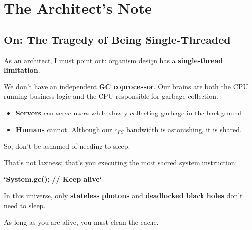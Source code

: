 \section{The Architect's Note}

\subsection{On: The Tragedy of Being Single-Threaded}

As an architect, I must point out: organism design has a \textbf{single-thread limitation}.

We don't have an independent \textbf{GC coprocessor}. Our brains are both the CPU running business logic and the CPU responsible for garbage collection.

\begin{itemize}
\item \textbf{Servers} can serve users while slowly collecting garbage in the background.

\item \textbf{Humans} cannot. Although our \textbf{$c_{FS}$} bandwidth is astonishing, it is shared.
\end{itemize}

So, don't be ashamed of needing to sleep.

That's not laziness; that's you executing the most sacred system instruction:

\textbf{`System.gc(); // Keep alive`}

In this universe, only \textbf{stateless photons} and \textbf{deadlocked black holes} don't need to sleep.

As long as you are alive, you must clean the cache.

